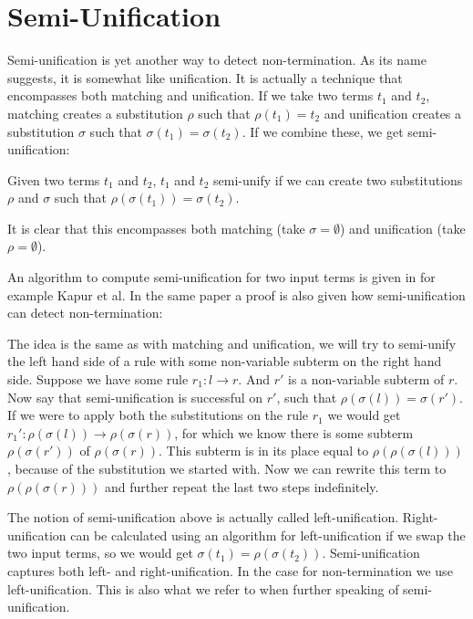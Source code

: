 \chapter{Semi-Unification}\label{semi-unification}
Semi-unification is yet another way to detect non-termination. As its name suggests, it is somewhat like unification. It is actually a technique that encompasses both matching and unification. If we take two terms $t_1$ and $t_2$, matching creates a substitution $\rho$ such that $\rho(t_1) = t_2$ and unification creates a substitution $\sigma$ such that $\sigma(t_1) = \sigma(t_2)$. If we combine these, we get semi-unification:

\begin{definition}
Given two terms $t_1$ and $t_2$, $t_1$ and $t_2$ semi-unify if we can create two substitutions $\rho$ and $\sigma$ such that $\rho(\sigma(t_1)) = \sigma(t_2)$.
\end{definition}

It is clear that this encompasses both matching (take $\sigma = \emptyset$) and unification (take $\rho = \emptyset$). 

An algorithm to compute semi-unification for two input terms is given in for example Kapur et al\cite{SemiUnification}. In the same paper a proof is also given how semi-unification can detect non-termination:

The idea is the same as with matching and unification, we will try to semi-unify the left hand side of a rule with some non-variable subterm on the right hand side. Suppose we have some rule $r_1: l \rightarrow r$. And $r'$ is a non-variable subterm of $r$. Now say that semi-unification is successful on $r'$, such that $\rho(\sigma(l)) = \sigma(r')$. If we were to apply both the substitutions on the rule $r_1$ we would get $r_1': \rho(\sigma(l)) \rightarrow \rho(\sigma(r))$, for which we know there is some subterm $\rho(\sigma(r'))$ of $\rho(\sigma(r))$. This subterm is in its place equal to $\rho(\rho(\sigma(l)))$, because of the substitution we started with. Now we can rewrite this term to $\rho(\rho(\sigma(r)))$ and further repeat the last two steps indefinitely.

The notion of semi-unification above is actually called left-unification. Right-unification can be calculated using an algorithm for left-unification if we swap the two input terms, so we would get $\sigma(t_1) = \rho(\sigma(t_2))$. Semi-unification captures both left- and right-unification. In the case for non-termination we use left-unification. This is also what we refer to when further speaking of semi-unification.

